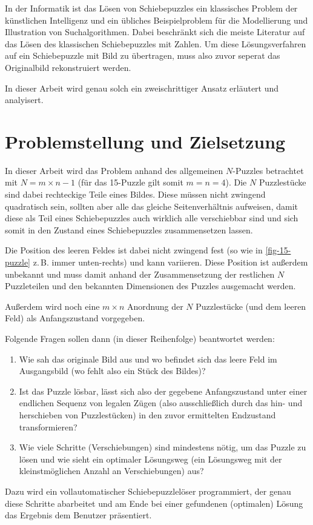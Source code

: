 \documentclass{whswinvcbook}
\begin{document}
In der Informatik ist das Lösen von Schiebepuzzles ein klassisches Problem der künstlichen Intelligenz und ein übliches Beispielproblem für die Modellierung und Illustration von Suchalgorithmen. Dabei beschränkt sich die meiste Literatur auf das Lösen des klassischen Schiebepuzzles mit Zahlen. Um diese Lösungsverfahren auf ein Schiebepuzzle mit Bild zu übertragen, muss also zuvor seperat das Originalbild rekonstruiert werden.

In dieser Arbeit wird genau solch ein zweischrittiger Ansatz erläutert und analyisert.
\section{Problemstellung und Zielsetzung}
In dieser Arbeit wird das Problem anhand des allgemeinen $N$-Puzzles betrachtet mit $N=m\times n-1$ (für das 15-Puzzle gilt somit $m=n=4$).
Die $N$ Puzzlestücke sind dabei rechteckige Teile eines Bildes. Diese müssen nicht zwingend quadratisch sein, sollten aber alle das gleiche Seitenverhältnis aufweisen, damit diese als Teil eines Schiebepuzzles auch wirklich alle verschiebbar sind und sich somit in den Zustand eines Schiebepuzzles zusammensetzen lassen.

Die Position des leeren Feldes ist dabei nicht zwingend fest (so wie in \ref{fig-15-puzzle} z.\,B. immer unten-rechts) und kann variieren. Diese Position ist außerdem unbekannt und muss damit anhand der Zusammensetzung der restlichen $N$ Puzzleteilen und den bekannten Dimensionen des Puzzles ausgemacht werden.

Außerdem wird noch eine $m\times n$ Anordnung der $N$ Puzzlestücke (und dem leeren Feld) als Anfangszustand vorgegeben.

Folgende Fragen sollen dann (in dieser Reihenfolge) beantwortet werden:
\begin{enumerate}
    \item Wie sah das originale Bild aus und wo befindet sich das leere Feld im Ausgangsbild (wo fehlt also ein Stück des Bildes)?
    \item Ist das Puzzle lösbar, lässt sich also der gegebene Anfangszustand unter einer endlichen Sequenz von legalen Zügen (also ausschließlich durch das hin- und herschieben von Puzzlestücken) in den zuvor ermittelten Endzustand transformieren?
    \item Wie viele Schritte (Verschiebungen) sind mindestens nötig, um das Puzzle zu lösen und wie sieht ein optimaler Lösungsweg (ein Lösungsweg mit der kleinstmöglichen Anzahl an Verschiebungen) aus?
\end{enumerate}
Dazu wird ein vollautomatischer Schiebepuzzlelöser programmiert, der genau diese Schritte abarbeitet und am Ende bei einer gefundenen (optimalen) Lösung das Ergebnis dem Benutzer präsentiert.
\end{document}
